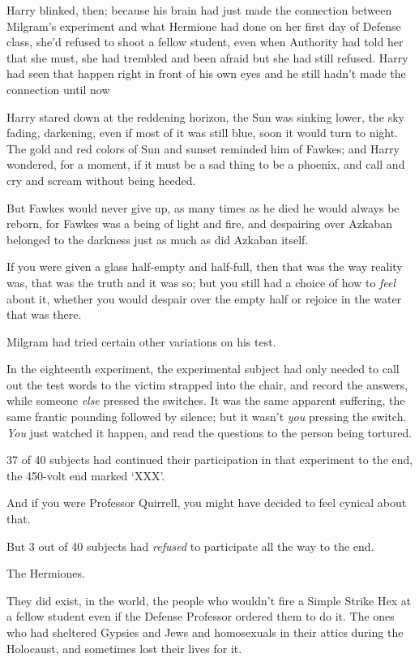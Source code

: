 Harry blinked, then; because his brain had just made the connection between
Milgram's experiment and what Hermione had done on her first day of Defense
class, she'd refused to shoot a fellow student, even when Authority had told
her that she must, she had trembled and been afraid but she had still refused.
Harry had seen that happen right in front of his own eyes and he still hadn't
made the connection until now{\el}

Harry stared down at the reddening horizon, the Sun was sinking lower, the sky
fading, darkening, even if most of it was still blue, soon it would turn to
night. The gold and red colors of Sun and sunset reminded him of Fawkes; and
Harry wondered, for a moment, if it must be a sad thing to be a phoenix, and
call and cry and scream without being heeded.

But Fawkes would never give up, as many times as he died he would always be
reborn, for Fawkes was a being of light and fire, and despairing over Azkaban
belonged to the darkness just as much as did Azkaban itself.

If you were given a glass half-empty and half-full, then that was the way
reality was, that was the truth and it was so; but you still had a choice of
how to \emph{feel} about it, whether you would despair over the empty half or
rejoice in the water that was there.

Milgram had tried certain other variations on his test.

In the eighteenth experiment, the experimental subject had only needed to call
out the test words to the victim strapped into the chair, and record the
answers, while someone \emph{else} pressed the switches. It was the same
apparent suffering, the same frantic pounding followed by silence; but it
wasn't \emph{you} pressing the switch. \emph{You} just watched it happen, and
read the questions to the person being tortured.

37 of 40 subjects had continued their participation in that experiment to the
end, the 450-volt end marked `XXX'.

And if you were Professor Quirrell, you might have decided to feel cynical
about that.

But 3 out of 40 subjects had \emph{refused} to participate all the way to the
end.

The Hermiones.

They did exist, in the world, the people who wouldn't fire a Simple Strike Hex
at a fellow student even if the Defense Professor ordered them to do it. The
ones who had sheltered Gypsies and Jews and homosexuals in their attics during
the Holocaust, and sometimes lost their lives for it.

